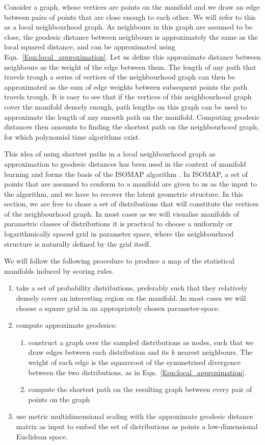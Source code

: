 Consider a graph, whose vertices are points on the manifold and we draw an edge between pairs of points that are close enough to each other. We will refer to this as a local neighbourhood graph. As neighbours in this graph are assumed to be close, the geodesic distance between neighbours is approximately the same as the local squared distance, and can be approximated using Eqn.\ \ref{Eqn:local_approximation}. Let us define this approximate distance between neighbours as the weight of the edge between them. The length of any path that travels trough a series of vertices of the neighbourhood graph can then be approximated as the sum of edge weights between subsequent points the path travels trough. It is easy to see that if the vertices of this neighbourhood graph cover the manifold densely enough, path lengths on this graph can be used to approximate the length of any smooth path on the manifold. Computing geodesic distances then amounts to finding the shortest path on the neighbourhood graph, for which polynomial time algorithms exist.

This idea of using shortest paths in a local neighbourhood graph as approximation to geodesic distances has been used in the context of manifold learning and forms the basis of the ISOMAP algorithm \citep{isomap}. In ISOMAP, a set of points that are assumed to conform to a manifold are given to us as the input to the algorithm, and we have to recover the latent geometric structure. In this section, we are free to chose a set of distributions that will constitute the vertices of the neighbourhood graph. In most cases as we will visualise manifolds of parametric classes of distributions it is practical to choose a uniformly or logarithmically spaced grid in parameter space, where the neighbourhood structure is naturally defined by the grid itself.

We will follow the following procedure to produce a map of the statistical manifolds induced by scoring rules.

\begin{enumerate}
\item take a set of probability distributions, preferably such that they relatively densely cover an interesting region on the manifold. In most cases we will choose a square grid in an appropriately chosen parameter-space.
\item compute approximate geodesics:
\begin{enumerate}
	\item construct a graph over the sampled distributions as nodes, such that we draw edges between each distribution and its $k$ nearest neighbours. The weight of each edge is the squareroot of the symmetrised divergence between the two distributions, as in Eqn.\ \eqref{Eqn:local_approximation}.
	\item compute the shortest path on the resulting graph between every pair of points on the graph
\end{enumerate}
\item use metric multidimensional scaling with the approximate geodesic distance matrix as input to embed the set of distributions as points a low-dimensional Euclidean space.
\end{enumerate}

